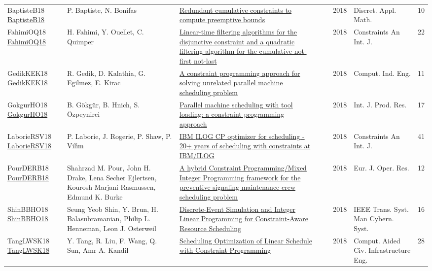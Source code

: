 {\begin{longtable}{p{3cm}p{6cm}p{7cm}rrrp{3cm}r}
BaptisteB18 \href{https://doi.org/10.1016/j.dam.2017.05.001}{BaptisteB18} & P. Baptiste, N. Bonifas & \href{articles/BaptisteB18.pdf}{Redundant cumulative constraints to compute preemptive bounds} &  & \cite{BaptisteB18} & 2018 & Discret. Appl. Math. & 10\\
FahimiOQ18 \href{https://doi.org/10.1007/s10601-018-9282-9}{FahimiOQ18} & H. Fahimi, Y. Ouellet, C. Quimper & \href{articles/FahimiOQ18.pdf}{Linear-time filtering algorithms for the disjunctive constraint and a quadratic filtering algorithm for the cumulative not-first not-last} &  & \cite{FahimiOQ18} & 2018 & Constraints An Int. J. & 22\\
GedikKEK18 \href{https://doi.org/10.1016/j.cie.2018.05.014}{GedikKEK18} & R. Gedik, D. Kalathia, G. Egilmez, E. Kirac & \href{articles/GedikKEK18.pdf}{A constraint programming approach for solving unrelated parallel machine scheduling problem} &  & \cite{GedikKEK18} & 2018 & Comput. Ind. Eng. & 11\\
GokgurHO18 \href{https://doi.org/10.1080/00207543.2017.1421781}{GokgurHO18} & B. G{\"{o}}kg{\"{u}}r, B. Hnich, S. {\"{O}}zpeynirci & \href{}{Parallel machine scheduling with tool loading: a constraint programming approach} &  & \cite{GokgurHO18} & 2018 & Int. J. Prod. Res. & 17\\
LaborieRSV18 \href{https://doi.org/10.1007/s10601-018-9281-x}{LaborieRSV18} & P. Laborie, J. Rogerie, P. Shaw, P. Vil{\'{\i}}m & \href{articles/LaborieRSV18.pdf}{{IBM} {ILOG} {CP} optimizer for scheduling - 20+ years of scheduling with constraints at {IBM/ILOG}} &  & \cite{LaborieRSV18} & 2018 & Constraints An Int. J. & 41\\
PourDERB18 \href{https://doi.org/10.1016/j.ejor.2017.08.033}{PourDERB18} & Shahrzad M. Pour, John H. Drake, Lena Secher Ejlertsen, Kourosh Marjani Rasmussen, Edmund K. Burke & \href{articles/PourDERB18.pdf}{A hybrid Constraint Programming/Mixed Integer Programming framework for the preventive signaling maintenance crew scheduling problem} &  & \cite{PourDERB18} & 2018 & Eur. J. Oper. Res. & 12\\
ShinBBHO18 \href{https://doi.org/10.1109/TSMC.2017.2681623}{ShinBBHO18} & Seung Yeob Shin, Y. Brun, H. Balasubramanian, Philip L. Henneman, Leon J. Osterweil & \href{articles/ShinBBHO18.pdf}{Discrete-Event Simulation and Integer Linear Programming for Constraint-Aware Resource Scheduling} &  & \cite{ShinBBHO18} & 2018 & {IEEE} Trans. Syst. Man Cybern. Syst. & 16\\
TangLWSK18 \href{https://doi.org/10.1111/mice.12277}{TangLWSK18} & Y. Tang, R. Liu, F. Wang, Q. Sun, Amr A. Kandil & \href{}{Scheduling Optimization of Linear Schedule with Constraint Programming} &  & \cite{TangLWSK18} & 2018 & Comput. Aided Civ. Infrastructure Eng. & 28\\

\end{longtable}}
